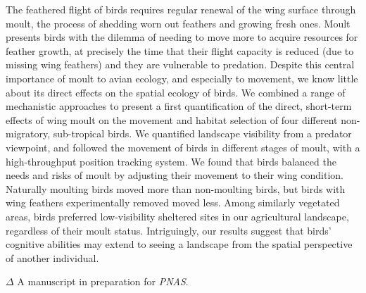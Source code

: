 \small{
    The feathered flight of birds requires regular renewal of the wing surface through moult, the process of shedding worn out feathers and growing fresh ones.
    Moult presents birds with the dilemma of needing to move more to acquire resources for feather growth, at precisely the time that their flight capacity is reduced (due to missing wing feathers) and they are vulnerable to predation.
    Despite this central importance of moult to avian ecology, and especially to movement, we know little about its direct effects on the spatial ecology of birds.
    We combined a range of mechanistic approaches to present a first quantification of the direct, short-term effects of wing moult on the movement and habitat selection of four different non-migratory, sub-tropical birds.
    We quantified landscape visibility from a predator viewpoint, and followed the movement of birds in different stages of moult, with a high-throughput position tracking system.
    We found that birds balanced the needs and risks of moult by adjusting their movement to their wing condition.
    Naturally moulting birds moved more than non-moulting birds, but birds with wing feathers experimentally removed moved less.
    Among similarly vegetated areas, birds preferred low-visibility sheltered sites in our agricultural landscape, regardless of their moult status.
    Intriguingly, our results suggest that birds' cognitive abilities may extend to seeing a landscape from the spatial perspective of another individual.

    \bigskip

    {\noindent \large{$\Delta$}} \normalfont A manuscript in preparation for \textit{PNAS}.

}

\clearpage
